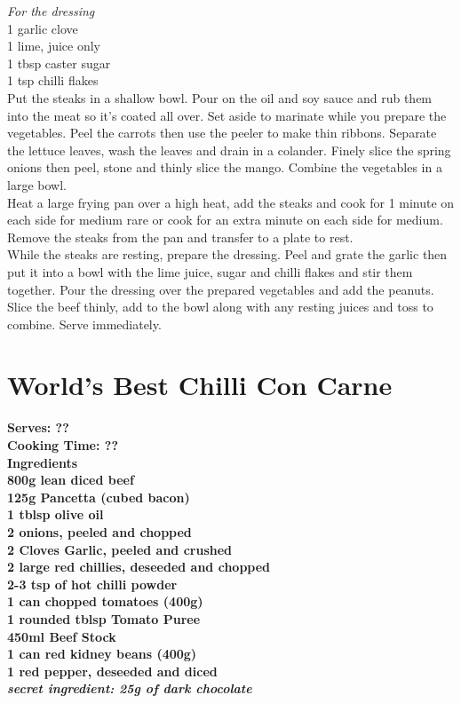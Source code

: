 \documentclass[18pt, oneside]{book}
\begin{document}
\textit{For the dressing} \\
1 garlic clove \\
1 lime, juice only \\
1 tbsp caster sugar \\
1 tsp chilli flakes \\

Put the steaks in a shallow bowl. Pour on the oil and soy sauce and rub them into the meat so it's coated all over. Set aside to marinate while you prepare the vegetables. Peel the carrots then use the peeler to make thin ribbons. Separate the lettuce leaves, wash the leaves and drain in a colander. Finely slice the spring onions then peel, stone and thinly slice the mango. Combine the vegetables in a large bowl. \\

Heat a large frying pan over a high heat, add the steaks and cook for 1 minute on each side for medium rare or cook for an extra minute on each side for medium. Remove the steaks from the pan and transfer to a plate to rest. \\

While the steaks are resting, prepare the dressing. Peel and grate the garlic then put it into a bowl with the lime juice, sugar and chilli flakes and stir them together. Pour the dressing over the prepared vegetables and add the peanuts. Slice the beef thinly, add to the bowl along with any resting juices and toss to combine. Serve immediately.



\section{World's Best Chilli Con Carne}
\bf{Serves: ??} \\
\bf{Cooking Time: ??} \\

\bf{Ingredients} \normalfont \\ 
800g lean diced beef \\
125g Pancetta (cubed bacon) \\
1 tblsp olive oil \\
2 onions, peeled and chopped \\
2 Cloves Garlic, peeled and crushed \\
2 large red chillies, deseeded and chopped \\
2-3 tsp of hot chilli powder \\ 
1 can chopped tomatoes (400g) \\
1 rounded tblsp Tomato Puree \\
450ml Beef Stock \\
1 can red kidney beans (400g) \\
1 red pepper, deseeded and diced \\
\it{secret ingredient}: \normalfont  25g of dark chocolate\\
 
\end{document}
